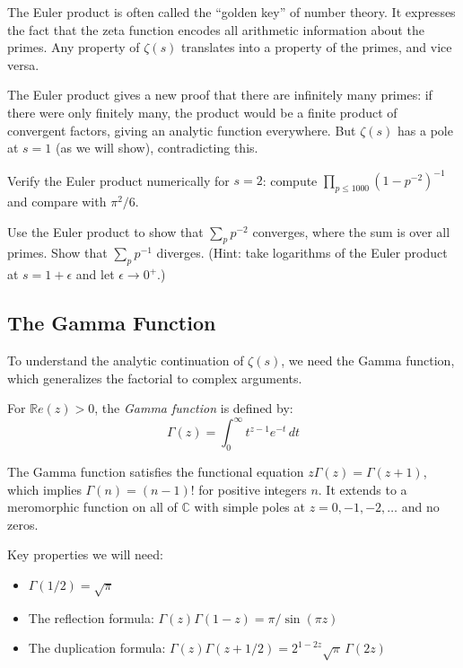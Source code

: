 \begin{remark}
The Euler product is often called the ``golden key'' of number theory. It expresses the fact that the zeta function encodes all arithmetic information about the primes. Any property of $\zeta(s)$ translates into a property of the primes, and vice versa.
\end{remark}

\begin{corollary}
\label{cor:infprime}
The Euler product gives a new proof that there are infinitely many primes: if there were only finitely many, the product would be a finite product of convergent factors, giving an analytic function everywhere. But $\zeta(s)$ has a pole at $s = 1$ (as we will show), contradicting this.
\end{corollary}

\begin{exercise}
\label{ex:eulerprod}
Verify the Euler product numerically for $s = 2$: compute $\prod_{p \le 1000} (1 - p^{-2})^{-1}$ and compare with $\pi^2 / 6$.
\end{exercise}

\begin{exercise}
\label{ex:eulerprod3}
Use the Euler product to show that $\sum_{p} p^{-2}$ converges, where the sum is over all primes. Show that $\sum_p p^{-1}$ diverges. (Hint: take logarithms of the Euler product at $s = 1 + \epsilon$ and let $\epsilon \to 0^+$.)
\end{exercise}

\subsection{The Gamma Function}

To understand the analytic continuation of $\zeta(s)$, we need the Gamma function, which generalizes the factorial to complex arguments.

\begin{definition}
For $\mathbb{R}e(z) > 0$, the \textit{Gamma function} is defined by:
\[
\Gamma(z) = \int_0^{\infty} t^{z-1} e^{-t} \, dt
\]
\end{definition}

The Gamma function satisfies the functional equation $z \Gamma(z) = \Gamma(z+1)$, which implies $\Gamma(n) = (n-1)!$ for positive integers $n$. It extends to a meromorphic function on all of $\mathbb{C}$ with simple poles at $z = 0, -1, -2, \ldots$ and no zeros.

Key properties we will need:
\begin{itemize}
  \item $\Gamma(1/2) = \sqrt{\pi}$
  \item The reflection formula: $\Gamma(z)\Gamma(1-z) = \pi / \sin(\pi z)$
  \item The duplication formula: $\Gamma(z)\Gamma(z + 1/2) = 2^{1-2z} \sqrt{\pi} \, \Gamma(2z)$
\end{itemize}

